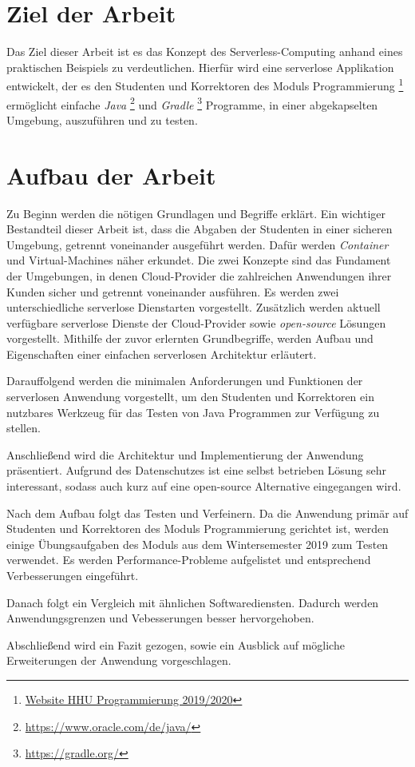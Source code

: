 \section{Ziel der Arbeit}
Das Ziel dieser Arbeit ist es das Konzept des Serverless-Computing anhand eines praktischen
Beispiels zu verdeutlichen. Hierfür wird eine serverlose Applikation entwickelt,
der es den Studenten und Korrektoren des Moduls Programmierung
\footnote{
  \href{
    https://www.cs.hhu.de/de/lehrstuehle-und-arbeitsgruppen/betriebssysteme-prof-dr-michael-schoettner/lehre-und-abschlussarbeiten/fruehere-lehrveranstaltungen/vorlesungen/ws-201920/programmierung.html?C=D\%253BO\%253DA
    }{Website HHU Programmierung 2019/2020}
} ermöglicht einfache
\textit{Java} \footnote{\url{https://www.oracle.com/de/java/}} und
\textit{Gradle} \footnote{\url{https://gradle.org/}} Programme, in einer abgekapselten Umgebung, auszuführen und zu testen.


\section{Aufbau der Arbeit}
Zu Beginn werden die nötigen Grundlagen und Begriffe erklärt.
Ein wichtiger Bestandteil dieser Arbeit ist, dass die Abgaben der Studenten in einer sicheren Umgebung, getrennt voneinander ausgeführt werden. Dafür werden \textit{Container} \cite{Docker} und Virtual-Machines näher erkundet. Die zwei Konzepte sind das Fundament der Umgebungen, in denen Cloud-Provider die zahlreichen Anwendungen ihrer Kunden sicher und getrennt voneinander ausführen.
Es werden zwei unterschiedliche serverlose Dienstarten vorgestellt. Zusätzlich werden aktuell verfügbare serverlose Dienste der Cloud-Provider sowie \textit{open-source} Lösungen vorgestellt. Mithilfe der zuvor erlernten Grundbegriffe, werden Aufbau und Eigenschaften einer einfachen serverlosen Architektur erläutert.

Darauffolgend werden die minimalen Anforderungen und Funktionen der serverlosen Anwendung vorgestellt, um den Studenten und Korrektoren ein nutzbares Werkzeug für das Testen von Java Programmen zur Verfügung zu stellen.

Anschließend wird die Architektur und Implementierung der Anwendung präsentiert. Aufgrund des Datenschutzes ist eine selbst betrieben Lösung sehr interessant, sodass auch kurz auf eine open-source Alternative eingegangen wird.

Nach dem Aufbau folgt das Testen und Verfeinern. Da die Anwendung primär auf Studenten und Korrektoren des Moduls Programmierung gerichtet ist, werden einige Übungsaufgaben des Moduls aus dem Wintersemester 2019 zum Testen verwendet. Es werden Performance-Probleme aufgelistet und entsprechend Verbesserungen eingeführt.

Danach folgt ein Vergleich mit ähnlichen Softwarediensten. Dadurch werden Anwendungsgrenzen und Vebesserungen besser hervorgehoben.

Abschließend wird ein Fazit gezogen, sowie ein Ausblick auf mögliche Erweiterungen der Anwendung vorgeschlagen.
